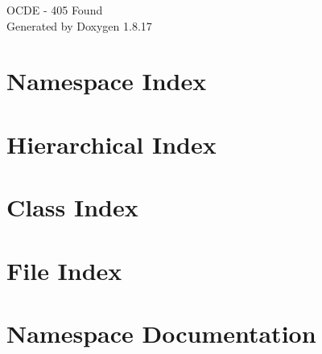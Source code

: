 \let\mypdfximage\pdfximage\def\pdfximage{\immediate\mypdfximage}\documentclass[twoside]{book}
\newcommand{\+}{\discretionary{\mbox{\scriptsize$\hookleftarrow$}}{}{}}
\newcommand{\clearemptydoublepage}{%
  \newpage{\pagestyle{empty}\cleardoublepage}%
}
\begin{document}
\hypersetup{pageanchor=false,
             bookmarksnumbered=true,
             pdfencoding=unicode
            }
\begin{titlepage}
\vspace*{7cm}
\begin{center}%
{\Large O\+C\+DE -\/ 405 Found }\\
\vspace*{1cm}
{\large Generated by Doxygen 1.8.17}\\
\end{center}
\end{titlepage}
\clearemptydoublepage
{}
\tableofcontents
\clearemptydoublepage
{}
\hypersetup{pageanchor=true}

\chapter{Namespace Index}

\chapter{Hierarchical Index}

\chapter{Class Index}

\chapter{File Index}

\chapter{Namespace Documentation}































\end{document}
